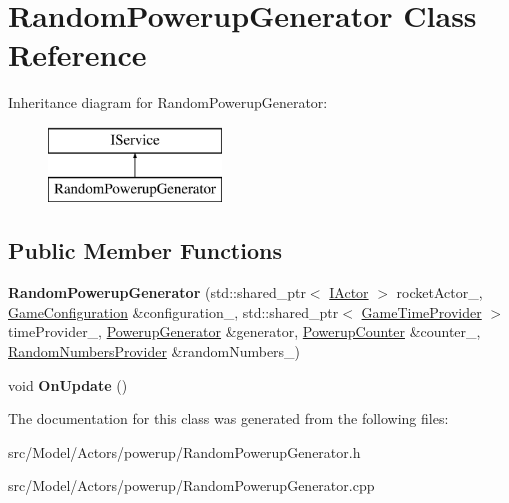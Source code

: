 \hypertarget{classRandomPowerupGenerator}{}\section{Random\+Powerup\+Generator Class Reference}
\label{classRandomPowerupGenerator}
Inheritance diagram for Random\+Powerup\+Generator\+:\begin{figure}[H]
\begin{center}
\leavevmode
\includegraphics[height=2.000000cm]{classRandomPowerupGenerator}
\end{center}
\end{figure}
\subsection*{Public Member Functions}
\begin{DoxyCompactItemize}
\item 
{\bfseries Random\+Powerup\+Generator} (std\+::shared\+\_\+ptr$<$ \hyperlink{classIActor}{I\+Actor} $>$ rocket\+Actor\+\_\+, \hyperlink{classGameConfiguration}{Game\+Configuration} \&configuration\+\_\+, std\+::shared\+\_\+ptr$<$ \hyperlink{classGameTimeProvider}{Game\+Time\+Provider} $>$ time\+Provider\+\_\+, \hyperlink{classPowerupGenerator}{Powerup\+Generator} \&generator, \hyperlink{classPowerupCounter}{Powerup\+Counter} \&counter\+\_\+, \hyperlink{classRandomNumbersProvider}{Random\+Numbers\+Provider} \&random\+Numbers\+\_\+)\hypertarget{classRandomPowerupGenerator_a3337ce702fc6c361298c81a740efe4ba}{}\label{classRandomPowerupGenerator_a3337ce702fc6c361298c81a740efe4ba}

\item 
void {\bfseries On\+Update} ()\hypertarget{classRandomPowerupGenerator_a972f12e116f4e5196a045a18501cd179}{}\label{classRandomPowerupGenerator_a972f12e116f4e5196a045a18501cd179}

\end{DoxyCompactItemize}


The documentation for this class was generated from the following files\+:\begin{DoxyCompactItemize}
\item 
src/\+Model/\+Actors/powerup/Random\+Powerup\+Generator.\+h\item 
src/\+Model/\+Actors/powerup/Random\+Powerup\+Generator.\+cpp\end{DoxyCompactItemize}
